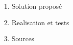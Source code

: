 \begin{enumerate}
	\item{Solution proposé}
	\item{Realisation et tests}
	\item{Sources}

\end{enumerate}
